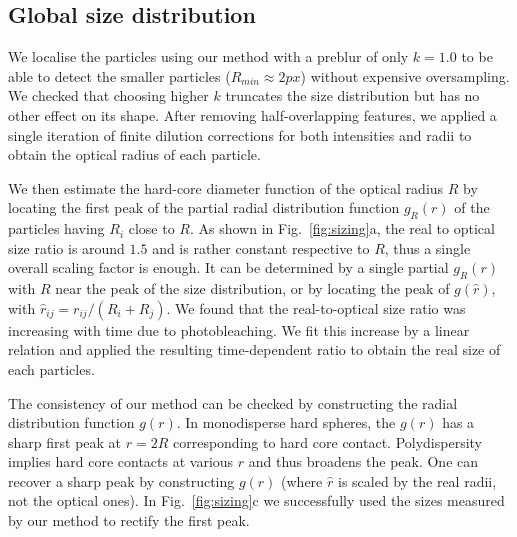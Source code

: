 \documentclass[8.5pt,twoside,twocolumn]{article}
\begin{document}
\subsection{Global size distribution}

We localise the particles using our method with a preblur of only $k=1.0$ to be able to detect the smaller particles ($R_{min}\approx \unit{2}{px}$) without expensive oversampling. We checked that choosing higher $k$ truncates the size distribution but has no other effect on its shape. After removing half-overlapping features, we applied a single iteration of finite dilution corrections for both intensities and radii to obtain the optical radius of each particle. 

We then estimate the hard-core diameter function of the optical radius $R$ by locating the first peak of the partial radial distribution function $g_R(r)$ of the particles having $R_i$ close to $R$. As shown in Fig.~\ref{fig:sizing}a, the real to optical size ratio is around $1.5$ and is rather constant respective to $R$, thus a single overall scaling factor is enough. It can be determined by a single partial $g_R(r)$ with $R$ near the peak of the size distribution, or by locating the peak of $g(\hat{r})$, with $\hat{r}_{ij} = r_{ij}/(R_i+R_j)$. We found that the real-to-optical size ratio was increasing with time due to photobleaching. We fit this increase by a linear relation and applied the resulting time-dependent ratio to obtain the real size of each particles.

The consistency of our method can be checked by constructing the radial distribution function $g(r)$. In monodisperse hard spheres, the $g(r)$ has a sharp first peak at $r=2R$ corresponding to hard core contact. Polydispersity implies hard core contacts at various $r$ and thus broadens the peak. One can recover a sharp peak by constructing $g(\hat{r})$ (where $\hat{r}$ is scaled by the real radii, not the optical ones). In Fig.~\ref{fig:sizing}c we successfully used the sizes measured by our method to rectify the first peak.
\end{document}
